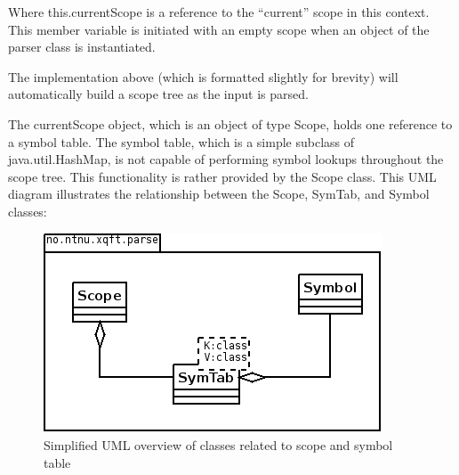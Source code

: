 Where this.currentScope is a reference to the ``current'' scope in this
context. This member variable is initiated with an empty scope when an object
of the parser class is instantiated.

The implementation above (which is formatted slightly for brevity) will
automatically build a scope tree as the input is parsed.

The currentScope object, which is an object of type Scope, holds one reference
to a symbol table. The symbol table, which is a simple subclass of
java.util.HashMap, is not capable of performing symbol lookups throughout the
scope tree. This functionality is rather provided by the Scope class. This UML diagram
illustrates the relationship between the Scope, SymTab, and Symbol classes:
\begin{figure}[!h]
  \centering
    \includegraphics[scale=0.8]{img/uml1}
  \caption{Simplified UML overview of classes related to scope and symbol table}
\end{figure}

